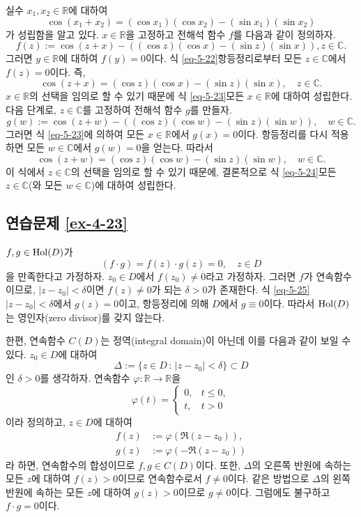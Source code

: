 실수 $x_1, x_2 \in\mathbb R$에 대하여
\begin{equation}\label{eq-5-22}
\cos (x_1 + x_2) = (\cos x_1)(\cos x_2) - (\sin x_1)(\sin x_2)
\end{equation}
가 성립함을 알고 있다.
$x\in \mathbb R$을 고정하고 전해석 함수 $f$를 다음과 같이 정의하자.
\[
f(z):= \cos(z+x) - \left( (\cos z)(\cos x) - (\sin z)(\sin x) \right),
z\in\mathbb C.
\]
그러면 $y\in\mathbb R$에 대하여 $f(y)=0$이다.
식 \eqref{eq-5-22}\와 항등정리로부터
모든 $z\in\mathbb C$에서 $f(z)=0$이다.
즉,
\begin{equation}\label{eq-5-23}
\cos (z + x) = (\cos z)(\cos x) - (\sin z)(\sin x),\quad z\in\mathbb C.
\end{equation}
$x\in\mathbb R$의 선택을 임의로 할 수 있기 때문에
식 \eqref{eq-5-23}\은  모든 $x\in\mathbb R$에 대하여 성립한다.
다음 단계로, $z\in\mathbb C$를 고정하여
전해석 함수 $g$를 만들자.
\[
g(w):= \cos(z+w) - \left( (\cos z)(\cos w) - (\sin z)(\sin w) \right), \quad w\in\mathbb C.
\]
그러면 식 \eqref{eq-5-23}에 의하여 
모든 $x\in\mathbb R$에서 $g(x)=0$이다.
항등정리를 다시 적용하면 모든 $w\in\mathbb C$에서 $g(w)=0$을 얻는다.
따라서
\begin{equation}\label{eq-5-24}
\cos (z+w) =  (\cos z)(\cos w) - (\sin z)(\sin w), \quad w\in\mathbb C.
\end{equation}
이 식에서 $z\in\mathbb C$의 선택을 임의로 할 수 있기 때문에,
결론적으로 식 \eqref{eq-5-24}\는 모든 $z\in\mathbb C$(와 모든 $w\in\mathbb C$)에
대하여 성립한다.

\subsection*{연습문제 \ref{ex-4-23}}

$f,g\in\mathop{\mathrm{Hol}}(D)$가
\begin{equation}\label{eq-5-25}
(f\cdot g) = f(z)\cdot g(z) = 0, \quad z\in D
\end{equation}
을 만족한다고 가정하자.
$z_0\in D$에서 $f(z_0)\ne0$라고 가정하자. 그러면
$f$가 연속함수이므로,
$|z-z_0|<\delta$이면 $f(z)\ne0$가 되는 $\delta>0$가 존재한다.
식 \eqref{eq-5-25} $|z-z_0|<\delta$에서 
$g(z)=0$이고, 항등정리에 의해 $D$에서 $g\equiv 0$이다.
따라서 $\mathop{\mathrm{Hol}}(D)$는 영인자(zero divisor)를 갖지 않는다.

한편, 연속함수 $C(D)$는 정역(integral domain)이 아닌데
이를 다음과 같이 보일 수 있다.
$z_0\in D$에 대하여
\[
\Delta := \{ z\in D \,:\, |z-z_0| <\delta \} \subset D
\]
인 $\delta >0$를 생각하자.
연속함수 $\varphi: \mathbb R \to \mathbb R$을
\[
\varphi(t) = \begin{cases}
0, & t\le 0, \\
t, & t>0
\end{cases}
\]
이라 정의하고, $z\in D$에 대하여
\begin{align*}
f(z) &:=  \varphi(\Re(z-z_0)), \\
g(z) &:=  \varphi(-\Re(z-z_0))
\end{align*}
라 하면, 
연속함수의 합성이므로 $ f, g\in C(D)$이다.
또한, $\Delta$의 오른쪽 반원에 속하는 모든 $z$에 대하여 $f(z)>0$이므로
연속함수로서 $f\ne0$이다. 같은 방법으로 
$\Delta$의 왼쪽 반원에 속하는 모든 $z$에 대하여 $g(z)>0$이므로
$g\ne0$이다. 그럼에도 불구하고 $f\cdot g=0$이다.

